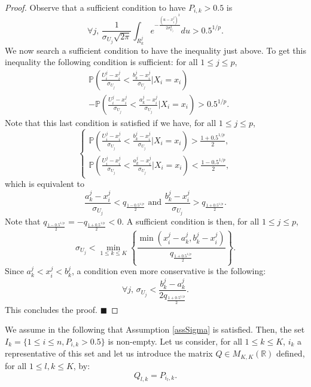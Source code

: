 \documentclass[twoside,11pt]{article}
\begin{document}
\begin{proof}
Observe that a sufficient condition to have $P_{i,k}>0.5$ is
\[
\forall j,\, \frac{1}{\sigma_{U_j}\sqrt{2\pi}}\int_{R_k^j}e^{-\frac{(u-x_i^j)^2}{2\sigma_{U_j}^2}}du>0.5^{1/p}.
\]
We now search a sufficient condition to have the inequality just above. To get this inequality the following condition is sufficient: for all $1\leq j\leq p$,
\begin{align}
&\mathbb{P}\left(\frac{U_i^j-x_i^j}{\sigma_{U_j}}<\frac{b_k^j-x_i^j}{\sigma_{U_j}}|X_i=x_i\right) \nonumber\\
&-\mathbb{P}\left(\frac{U_i^j-x_i^j}{\sigma_{U_j}}<\frac{a_k^j-x_i^j}{\sigma_{U_j}}|X_i=x_i\right)>0.5^{1/p}.\label{eq:diff-proba}
\end{align}
Note that this last condition is satisfied if we have, for all $1\leq j \leq p$,
 \begin{equation*}
    \left\{
\begin{array}{l}
   \mathbb{P}\left(\frac{U_i^j-x_i^j}{\sigma_{U_j}}<\frac{b_k^j-x_i^j}{\sigma_{U_j}}|X_i=x_i\right)>\frac{1+0.5^{1/p}}{2},\\
   \mathbb{P}\left(\frac{U_i^j-x_i^j}{\sigma_{U_j}}<\frac{a_k^j-x_i^j}{\sigma_{U_j}}|X_i=x_i\right)<\frac{1-0.5^{1/p}}{2},
\end{array}
\right.
\end{equation*}
which is equivalent to
\[
\frac{a_k^j-x_i^j}{\sigma_{U_j}}<q_{\frac{1-0.5^{1/p}}{2}}\mbox{ and }\frac{b_k^j-x_i^j}{\sigma_{U_j}}>q_{\frac{1+0.5^{1/p}}{2}}.
\]
Note that $q_{\frac{1-0.5^{1/p}}{2}}=-q_{\frac{1+0.5^{1/p}}{2}}<0$. A sufficient condition is then, for all $1\leq j \leq p$,
\[
\sigma_{U_j}<\min_{1\leq k \leq K} \left\{  \frac{\min\left(x_i^j-a_k^j,b_k^j-x_i^j\right)}{q_{\frac{1+0.5^{1/p}}{2}}}\right\}.
\]
Since  $a_k^j<x_i^j<b_k^j$, a condition even more conservative is the following:
\[
\forall j,\, \sigma_{U_j}<\frac{b_k^j-a_k^j}{2q_{\frac{1+0.5^{1/p}}{2}}}.
\]
This concludes the proof.
\hfill $\blacksquare$
\end{proof}

We assume in the following that Assumption \eqref{assSigma} is satisfied. Then, the set $I_k = \{1\leq i \leq n, P_{i,k} >0.5 \}$ is non-empty. Let us consider, for all $1\leq k\leq K$, $i_k$ a representative of this set and let us introduce the matrix $Q \in M_{K,K}(\mathbb{R})$ defined, for all $1\leq l,k \leq K$, by:
%
\[
Q_{l,k} = P_{i_l,k}.
\]
%
\end{document}
